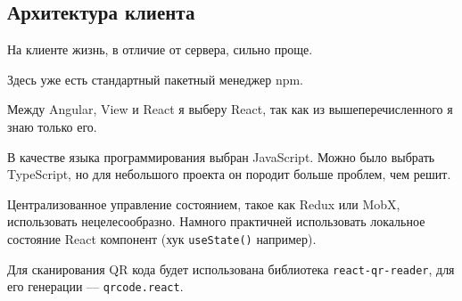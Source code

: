 \subsection{Архитектура клиента}
На клиенте жизнь, в отличие от сервера, сильно проще.

Здесь уже есть стандартный пакетный менеджер npm.

Между Angular, View и React я выберу React, так как из вышеперечисленного я знаю только его.

В качестве языка программирования выбран JavaScript.
Можно было выбрать TypeScript, но для небольшого проекта он породит больше проблем, чем решит.

Централизованное управление состоянием, такое как Redux или MobX, использовать нецелесообразно.
Намного практичней использовать локальное состояние React компонент (хук \texttt{useState()} например).

Для сканирования QR кода будет использована библиотека \texttt{react-qr-reader}, для его генерации --- \texttt{qrcode.react}.

